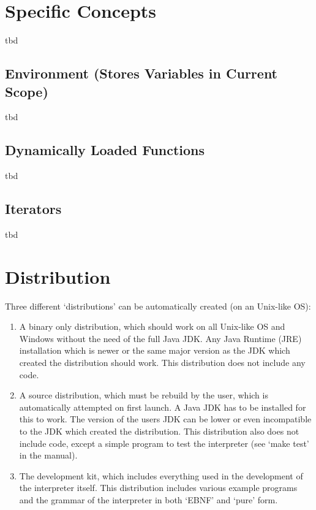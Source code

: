 \section{Specific Concepts}

tbd

\subsection{Environment (Stores Variables in Current Scope)}

tbd

\subsection{Dynamically Loaded Functions}

tbd

\subsection{Iterators}

tbd

\section{Distribution}

Three different `distributions' can be automatically created (on an Unix-like OS):

\begin{enumerate}
	\item A binary only distribution, which should work on all Unix-like OS and Windows without the need of the full Java JDK. Any Java Runtime (JRE) installation which is newer or the same major version as the JDK which created the distribution should work. This distribution does not include any \SetlX{} code.

	\item A source distribution, which must be rebuild by the user, which is automatically attempted on first launch. A Java JDK has to be installed for this to work. The version of the users JDK can be lower or even incompatible to the JDK which created the distribution. This distribution also does not include \SetlX{} code, except a simple program to test the interpreter (see `make test' in the manual).

	\item The development kit, which includes everything used in the development of the interpreter itself. This distribution includes various \SetlX{} example programs and the grammar of the interpreter in both `EBNF' and `pure' form.
\end{enumerate}


